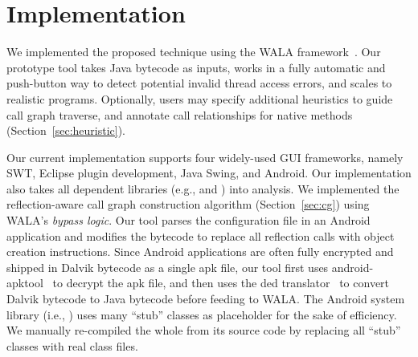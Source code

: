 \section{Implementation}
\label{sec:implementation}

We implemented the proposed technique using the WALA framework~\cite{walatutorial}.
Our prototype tool takes Java bytecode as inputs, works in a fully
automatic and push-button way to detect potential invalid thread access
errors, and scales to realistic programs.  
Optionally, users may specify additional heuristics to guide call graph
traverse, and annotate call relationships for native methods (Section~\ref{sec:heuristic}).

Our current implementation supports four widely-used GUI frameworks, namely
SWT, Eclipse plugin development, Java Swing, and Android.
Our implementation %
also takes
all dependent libraries (e.g.,  and )
into analysis. We implemented the reflection-aware call graph construction
 algorithm (Section~\ref{sec:cg})
using WALA's \textit{bypass logic}. Our tool parses the configuration file
in an Android application and modifies the bytecode to replace all
reflection calls with object creation instructions.
Since Android applications are often fully encrypted and shipped in Dalvik
bytecode as a single apk file, our tool first uses
android-apktool~\cite{apktool} to
decrypt the apk file, and then uses the 
ded translator~\cite{Enck:2011:SAA:2028067.2028088} to convert
Dalvik bytecode to Java bytecode before feeding to WALA.  The Android system
library (i.e., ) uses many ``stub'' classes as
placeholder for the sake of efficiency. We manually re-compiled the whole
 from its source code by replacing all ``stub'' classes
with real class files.


